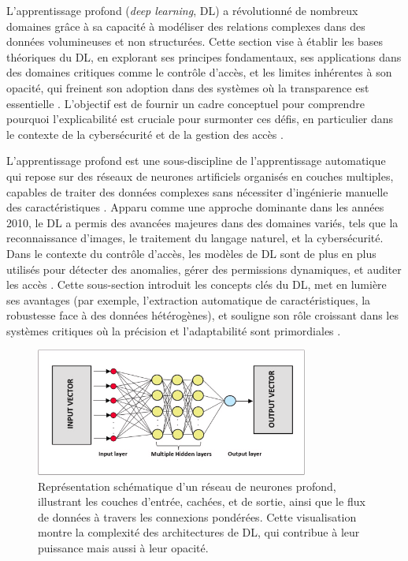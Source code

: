 
L’apprentissage profond (\textit{deep learning}, DL) a révolutionné de nombreux domaines grâce à sa capacité à modéliser des relations complexes dans des données volumineuses et non structurées. Cette section vise à établir les bases théoriques du DL, en explorant ses principes fondamentaux, ses applications dans des domaines critiques comme le contrôle d’accès, et les limites inhérentes à son opacité, qui freinent son adoption dans des systèmes où la transparence est essentielle \cite{jouis2020}. L’objectif est de fournir un cadre conceptuel pour comprendre pourquoi l’explicabilité est cruciale pour surmonter ces défis, en particulier dans le contexte de la cybersécurité et de la gestion des accès \cite{zhang2022xai}.

L’apprentissage profond est une sous-discipline de l’apprentissage automatique qui repose sur des réseaux de neurones artificiels organisés en couches multiples, capables de traiter des données complexes sans nécessiter d’ingénierie manuelle des caractéristiques \cite{lecun2015deep}. Apparu comme une approche dominante dans les années 2010, le DL a permis des avancées majeures dans des domaines variés, tels que la reconnaissance d’images, le traitement du langage naturel, et la cybersécurité. Dans le contexte du contrôle d’accès, les modèles de DL sont de plus en plus utilisés pour détecter des anomalies, gérer des permissions dynamiques, et auditer les accès \cite{nobi2022dlbac}. Cette sous-section introduit les concepts clés du DL, met en lumière ses avantages (par exemple, l’extraction automatique de caractéristiques, la robustesse face à des données hétérogènes), et souligne son rôle croissant dans les systèmes critiques où la précision et l’adaptabilité sont primordiales \cite{barredo2020xai}.

\begin{figure}[h]
    \centering
    \includegraphics[width=0.8\textwidth]{My-Thesis/Chap1/images/deep_learning_model.png}
    \caption{Représentation schématique d’un réseau de neurones profond, illustrant les couches d’entrée, cachées, et de sortie, ainsi que le flux de données à travers les connexions pondérées. Cette visualisation montre la complexité des architectures de DL, qui contribue à leur puissance mais aussi à leur opacité.}
    \label{fig:dl_overview}
\end{figure}

